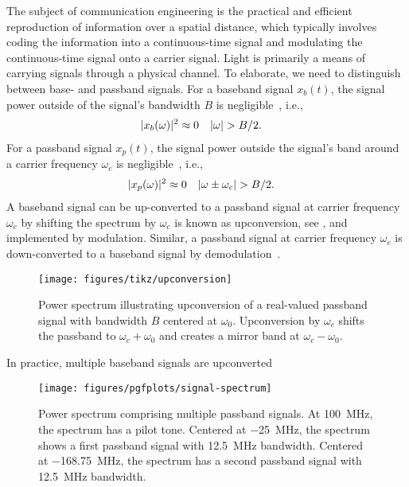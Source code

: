 The subject of communication engineering is the practical and efficient reproduction of information over a spatial distance, which typically involves coding the information into a continuous-time signal and modulating the continuous-time signal onto a carrier signal.
Light is primarily a means of carrying signals through a physical channel.
To elaborate, we need to distinguish between base- and passband signals.
For a baseband signal $x_b(t)$, the signal power outside of the signal's bandwidth $B$ is negligible~\cite[p.~15]{Madhow2008}, i.e.,
\begin{align}
	\lvert x_b(\omega)\rvert^2
	&\approx
	0
	&
	\lvert\omega\rvert
	&>
	B/2
	.
\end{align}
For a passband signal $x_p(t)$, the signal power outside the signal's band around a carrier frequency $\omega_c$ is negligible~\cite[p.~16]{Madhow2008}, i.e.,
\begin{align}
	\lvert x_p(\omega)\rvert^2
	&\approx
	0
	&
	\lvert\omega\pm\omega_c\rvert
	&>
	B/2
	.	
\end{align}
A baseband signal can be up-converted to a passband signal at carrier frequency $\omega_c$ by shifting the spectrum by $\omega_c$ is known as upconversion, see , and implemented by modulation.
Similar, a passband signal at carrier frequency $\omega_c$ is down-converted to a baseband signal by demodulation~\cite[p.~26]{Madhow2008}.
\begin{figure}[ht]
	\centering
	\texttt{[image: figures/tikz/upconversion]}
	\caption{Power spectrum illustrating upconversion of a real-valued passband signal with bandwidth $B$ centered at $\omega_0$. Upconversion by $\omega_c$ shifts the passband to $\omega_c+\omega_0$ and creates a mirror band at $\omega_c-\omega_0$.}\label{fig:upconversion}
\end{figure}
In practice, multiple baseband signals are upconverted
\begin{figure}[ht]
	\centering
	\texttt{[image: figures/pgfplots/signal-spectrum]}
	\caption{Power spectrum comprising multiple passband signals. At \SI{+100}{\mega\hertz}, the spectrum has a pilot tone. Centered at \SI{-25}{\mega\hertz}, the spectrum shows a first passband signal with \SI{12.5}{\mega\hertz} bandwidth. Centered at \SI{-168.75}{\mega\hertz}, the spectrum has a second passband signal with \SI{12.5}{\mega\hertz} bandwidth.}\label{fig:signal_spectrum}
\end{figure}

